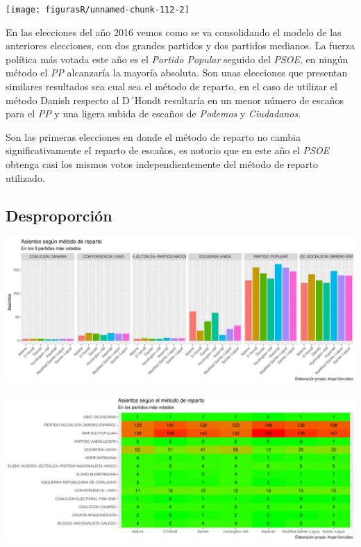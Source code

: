 \documentclass[12pt,a4paper,]{book}
\numberwithin{dummy}{section}
\theoremstyle{ocrenumbox}
\theoremstyle{blacknumex}
\theoremstyle{blacknumbox}
\theoremstyle{ocrenum}
\theoremstyle{ocrenum}
\begin{document}
\begin{center}\texttt{[image: figurasR/unnamed-chunk-112-2]} \end{center}

En las elecciones del año 2016 vemos como se va consolidando el modelo
de las anteriores elecciones, con dos grandes partidos y dos partidos
medianos. La fuerza política más votada este año es el \emph{Partido
Popular} seguido del \emph{PSOE}, en ningún método el \emph{PP}
alcanzaría la mayoría absoluta. Son unas elecciones que presentan
similares resultados sea cual sea el método de reparto, en el caso de
utilizar el método Danish respecto al D´Hondt resultaría en un menor
número de escaños para el \emph{PP} y una ligera subida de escaños de
\emph{Podemos} y \emph{Ciudadanos}.

Son las primeras elecciones en donde el método de reparto no cambia
significativamente el reparto de escaños, es notorio que en este año el
\emph{PSOE} obtenga casi los mismos votos independientemente del método
de reparto utilizado.

\hypertarget{desproporciuxf3n-12}{%
\subsection{Desproporción}\label{desproporciuxf3n-12}}

\begin{center}\includegraphics[width=1\linewidth]{figurasR/unnamed-chunk-113-1} \end{center}

\begin{center}\includegraphics[width=1\linewidth]{figurasR/unnamed-chunk-113-2} \end{center}
\end{document}
